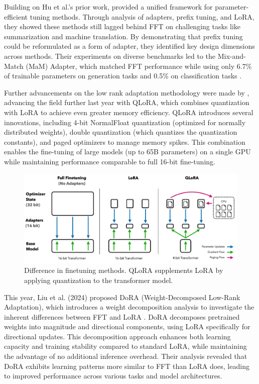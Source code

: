 \documentclass[11pt]{article}
\begin{document}
Building on Hu et al.’s prior work, \cite{he2022unified} provided a unified framework for parameter-efficient tuning methods. Through analysis of adapters, prefix tuning, and LoRA, they showed these methods still lagged behind FFT on challenging tasks like summarization and machine translation. By demonstrating that prefix tuning could be reformulated as a form of adapter, they identified key design dimensions across methods. Their experiments on diverse benchmarks led to the Mix-and-Match (MaM) Adapter, which matched FFT performance while using only 6.7\% of trainable parameters on generation tasks and 0.5\% on classification tasks \cite{he2022unified}.


Further advancements on the low rank adaptation methodology were made by \cite{dettmers2023qlora}, advancing the field further last year with QLoRA, which combines quantization with LoRA to achieve even greater memory efficiency. QLoRA introduces several innovations, including 4-bit NormalFloat quantization (optimized for normally distributed weights), double quantization (which quantizes the quantization constants), and paged optimizers to manage memory spikes. This combination enables the fine-tuning of large models (up to 65B parameters) on a single GPU while maintaining performance comparable to full 16-bit fine-tuning.

\begin{figure}[h]
	\includegraphics[width=5in]{qlora.png}
	\centering
	\caption{Difference in finetuning methods. QLoRA supplements LoRA by applying quantization to the transformer model. \cite{dettmers2023qlora}}
	\label{fig:qlora}
\end{figure}

This year, Liu et al. (2024) proposed DoRA (Weight-Decomposed Low-Rank Adaptation), which introduces a weight decomposition analysis to investigate the inherent differences between FFT and LoRA \cite{liu2024dora}. DoRA decomposes pretrained weights into magnitude and directional components, using LoRA specifically for directional updates. This decomposition approach enhances both learning capacity and training stability compared to standard LoRA, while maintaining the advantage of no additional inference overhead. Their analysis revealed that DoRA exhibits learning patterns more similar to FFT than LoRA does, leading to improved performance across various tasks and model architectures.
\end{document}
